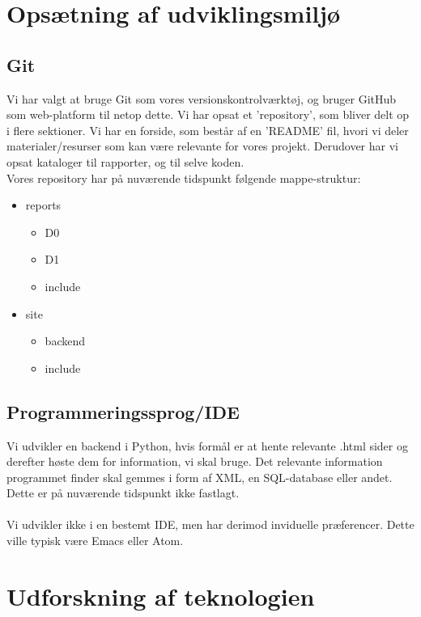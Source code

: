 \documentclass[11pt]{article}
\begin{document}
\section{Opsætning af udviklingsmiljø}
\subsection{Git}
Vi har valgt at bruge Git som vores versionskontrolværktøj, og bruger GitHub som web-platform til netop dette.
Vi har opsat et 'repository', som bliver delt op i flere sektioner. Vi har en forside, som består af en 'README' fil, hvori vi deler materialer/resurser som kan være relevante for vores projekt.
Derudover har vi opsat kataloger til rapporter, og til selve koden. \\
Vores repository har på nuværende tidspunkt følgende mappe-struktur:
\begin{itemize}
\item reports
  \begin{itemize}
  \item D0
  \item D1
  \item include
  \end{itemize}
\item site
  \begin{itemize}
  \item backend
  \item include
  \end{itemize}
\end{itemize}

\subsection{Programmeringssprog/IDE}
Vi udvikler en backend i Python, hvis formål er at hente relevante .html sider og derefter høste dem for information, vi skal bruge. Det relevante information programmet finder skal gemmes i form af XML, en SQL-database eller andet. Dette er på nuværende tidspunkt ikke fastlagt.\\
\\
Vi udvikler ikke i en bestemt IDE, men har derimod inviduelle præferencer. Dette ville typisk være Emacs eller Atom.

\section{Udforskning af teknologien}
\end{document}
